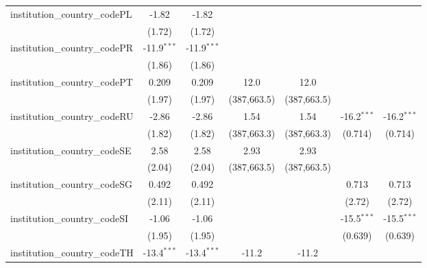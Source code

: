\begin{tabular}{lcccccc}
   institution\_country\_codePL          & -1.82         & -1.82         &               &               &               &   \\   
                                         & (1.72)        & (1.72)        &               &               &               &   \\   
   institution\_country\_codePR          & -11.9$^{***}$ & -11.9$^{***}$ &               &               &               &   \\   
                                         & (1.86)        & (1.86)        &               &               &               &   \\   
   institution\_country\_codePT          & 0.209         & 0.209         & 12.0          & 12.0          &               &   \\   
                                         & (1.97)        & (1.97)        & (387,663.5)   & (387,663.5)   &               &   \\   
   institution\_country\_codeRU          & -2.86         & -2.86         & 1.54          & 1.54          & -16.2$^{***}$ & -16.2$^{***}$\\   
                                         & (1.82)        & (1.82)        & (387,663.3)   & (387,663.3)   & (0.714)       & (0.714)\\   
   institution\_country\_codeSE          & 2.58          & 2.58          & 2.93          & 2.93          &               &   \\   
                                         & (2.04)        & (2.04)        & (387,663.5)   & (387,663.5)   &               &   \\   
   institution\_country\_codeSG          & 0.492         & 0.492         &               &               & 0.713         & 0.713\\   
                                         & (2.11)        & (2.11)        &               &               & (2.72)        & (2.72)\\   
   institution\_country\_codeSI          & -1.06         & -1.06         &               &               & -15.5$^{***}$ & -15.5$^{***}$\\   
                                         & (1.95)        & (1.95)        &               &               & (0.639)       & (0.639)\\   
   institution\_country\_codeTH          & -13.4$^{***}$ & -13.4$^{***}$ & -11.2         & -11.2         &               &   \\   

\end{tabular}

